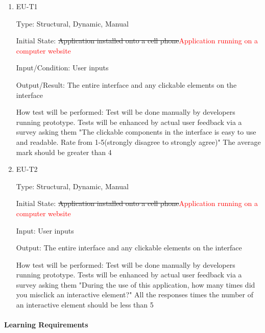 \documentclass[12pt, titlepage]{article}
\begin{document}
\begin{enumerate}

\item{EU-T1\\}

Type: Structural, Dynamic, Manual
					
Initial State: \sout{Application installed onto a cell phone}\textcolor{red}{Application running on a computer website}
					
Input/Condition: User inputs
					
Output/Result: The entire interface and any clickable elements on the interface
					
How test will be performed: Test will be done manually by developers running prototype. Tests will be enhanced by actual user feedback via a survey asking them "The clickable components in the interface is easy to use and readable. Rate from 1-5(strongly disagree to strongly agree)" The average mark should be greater than 4
					
\item{EU-T2\\}

Type: Structural, Dynamic, Manual
					
Initial State: \sout{Application installed onto a cell phone}\textcolor{red}{Application running on a computer website}
					
Input: User inputs
					
Output: The entire interface and any clickable elements on the interface
					
How test will be performed: Test will be done manually by developers running prototype. Tests will be enhanced by actual user feedback via a survey asking them "During the use of this application, how many times did you misclick an interactive element?" All the responses times the number of an interactive element should be less than 5

\end{enumerate}

\paragraph{Learning Requirements}
\end{document}
